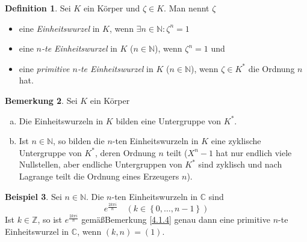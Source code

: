 \documentclass[
twoside=semi,
fontsize=12,
DIV=12, 
cleardoublepage=current,
leqno,
headings=optiontoheadandtoc, 
toc=idx
]{scrbook}
\newcommand{\N}{\mathbb{N}}
\newcommand{\Z}{\mathbb{Z}}
\newcommand{\C}{\mathbb{C}}
\newcommand{\set}[1]{\left\{ #1 \right\}}
\theoremstyle{definition}
\newtheorem{definition}{Definition}[section]
\newtheorem{bemerkung}[definition]{Bemerkung}
\newtheorem{beispiel}[definition]{Beispiel}
\begin{document}
 	\begin{definition}\label{4.1.5}\hfill\newline
 		Sei $K$ ein K\"orper und $\zeta \in K$. Man nennt $\zeta$
 		\begin{itemize}
 			\item eine \emph{Einheitswurzel} in $K$, wenn $\exists n \in \N: \zeta^n = 1$
 			\item eine \emph{$n$-te Einheitswurzel} in $K$ ($n \in \N$), wenn $\zeta^n = 1$ und
 			\item eine \emph{primitive $n$-te Einheitswurzel} in $K$ ($n \in \N$), wenn $\zeta \in K^*$ die Ordnung $n$ hat. 
 		\end{itemize}
 	\end{definition}
 	
 	\begin{bemerkung}\label{4.1.6}\hfill\newline
 		Sei $K$ ein K\"orper 
 		\begin{enumerate}[(a)]
 			\item Die Einheitswurzeln in $K$ bilden eine Untergruppe von $K^*$.
 			\item Ist $n \in \N$, so bilden die $n$-ten Einheitswurzeln in $K$ eine zyklische Untergruppe von $K^*$, deren Ordnung $n$ teilt ($X^n-1$ hat nur endlich viele Nullstellen,
 			aber endliche Untergruppen von $K^*$ sind zyklisch und nach Lagrange teilt die Ordnung eines Erzeugers $n$).
 		\end{enumerate}
 	\end{bemerkung}
 
 	\begin{beispiel}\label{4.1.7}\hfill\newline
 		Sei $n \in \N$. Die $n$-ten Einheitswurzeln in $\C$ sind 	
 			\[e^{\frac{2k \pi i}{n}} \quad (k \in \set{0, \dots, n-1})\]
 		Ist $k \in \Z$, so ist $e^{\frac{2k \pi i}{n}}$ gem\"a\ss Bemerkung \ref{4.1.4} genau dann eine primitive $n$-te Einheitswurzel in $\C$, wenn $(k, n) = (1)$.
 	\end{beispiel}
 
\end{document}
